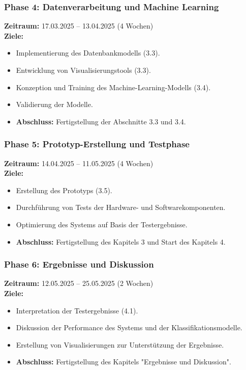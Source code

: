 \documentclass{scrartcl}
\begin{document}
\subsubsection*{Phase 4: Datenverarbeitung und Machine Learning}
\textbf{Zeitraum:} 17.03.2025 – 13.04.2025 (4 Wochen)  \\
\textbf{Ziele:}
\begin{itemize}
	\item Implementierung des Datenbankmodells (3.3).
	\item Entwicklung von Visualisierungstools (3.3).
	\item Konzeption und Training des Machine-Learning-Modells (3.4).
	\item Validierung der Modelle.
	\item \textbf{Abschluss:} Fertigstellung der Abschnitte 3.3 und 3.4.
\end{itemize}

\subsubsection*{Phase 5: Prototyp-Erstellung und Testphase}
\textbf{Zeitraum:} 14.04.2025 – 11.05.2025 (4 Wochen)  \\
\textbf{Ziele:}
\begin{itemize}
	\item Erstellung des Prototyps (3.5).
	\item Durchführung von Tests der Hardware- und Softwarekomponenten.
	\item Optimierung des Systems auf Basis der Testergebnisse.
	\item \textbf{Abschluss:} Fertigstellung des Kapitels 3 und Start des Kapitels 4.
\end{itemize}

\subsubsection*{Phase 6: Ergebnisse und Diskussion}
\textbf{Zeitraum:} 12.05.2025 – 25.05.2025 (2 Wochen)  \\
\textbf{Ziele:}
\begin{itemize}
	\item Interpretation der Testergebnisse (4.1).
	\item Diskussion der Performance des Systems und der Klassifikationsmodelle.
	\item Erstellung von Visualisierungen zur Unterstützung der Ergebnisse.
	\item \textbf{Abschluss:} Fertigstellung des Kapitels "Ergebnisse und Diskussion".
\end{itemize}
\end{document}
